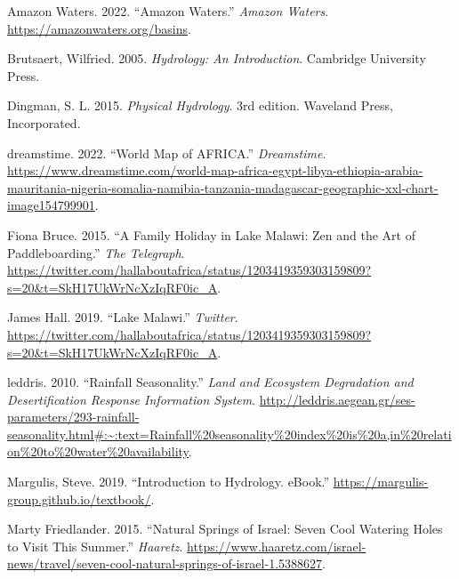 \documentclass[
  letterpaper,
  DIV=11,
  numbers=noendperiod]{scrreprt}
\newlength{\cslhangindent}
\newlength{\cslentryspacingunit} %
\newenvironment{CSLReferences}[2] %
 {%
  \setlength{\parindent}{0pt}
  \ifodd #1
  \let\oldpar\par
  \def\par{\hangindent=\cslhangindent\oldpar}
  \fi
  \setlength{\parskip}{#2\cslentryspacingunit}
 }%
 {}
\begin{document}

\hypertarget{refs}{}
\begin{CSLReferences}{1}{0}
\leavevmode{}%
Amazon Waters. 2022. {``Amazon Waters.''} \emph{Amazon Waters}.
\url{https://amazonwaters.org/basins}.

\leavevmode{}%
Brutsaert, Wilfried. 2005. \emph{Hydrology: An Introduction}. Cambridge
University Press.

\leavevmode{}%
Dingman, S. L. 2015. \emph{Physical Hydrology}. 3rd edition. Waveland
Press, Incorporated.

\leavevmode{}%
dreamstime. 2022. {``World Map of AFRICA.''} \emph{Dreamstime}.
\url{https://www.dreamstime.com/world-map-africa-egypt-libya-ethiopia-arabia-mauritania-nigeria-somalia-namibia-tanzania-madagascar-geographic-xxl-chart-image154799901}.

\leavevmode{}%
Fiona Bruce. 2015. {``A Family Holiday in Lake Malawi: Zen and the Art
of Paddleboarding.''} \emph{The Telegraph}.
\url{https://twitter.com/hallaboutafrica/status/1203419359303159809?s=20\&t=SkH17UkWrNcXzIqRF0ic_A}.

\leavevmode{}%
James Hall. 2019. {``Lake Malawi.''} \emph{Twitter}.
\url{https://twitter.com/hallaboutafrica/status/1203419359303159809?s=20\&t=SkH17UkWrNcXzIqRF0ic_A}.

\leavevmode{}%
leddris. 2010. {``Rainfall Seasonality.''} \emph{Land and Ecosystem
Degradation and Desertification Response Information System}.
\url{http://leddris.aegean.gr/ses-parameters/293-rainfall-seasonality.html\#:~:text=Rainfall\%20seasonality\%20index\%20is\%20a,in\%20relation\%20to\%20water\%20availability}.

\leavevmode{}%
Margulis, Steve. 2019. {``Introduction to Hydrology. eBook.''}
\url{https://margulis-group.github.io/textbook/}.

\leavevmode{}%
Marty Friedlander. 2015. {``Natural Springs of Israel: Seven Cool
Watering Holes to Visit This Summer.''} \emph{Haaretz}.
\url{https://www.haaretz.com/israel-news/travel/seven-cool-natural-springs-of-israel-1.5388627}.


\end{CSLReferences}
\end{document}
